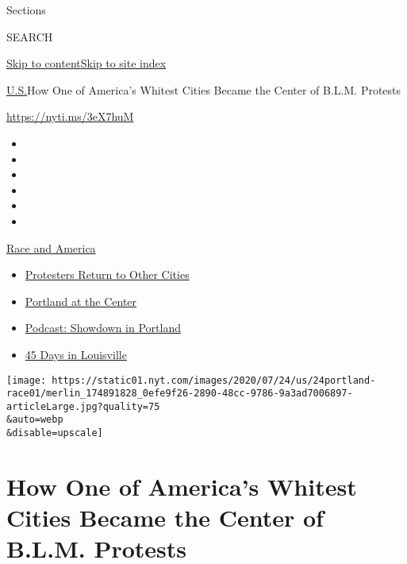 Sections

SEARCH

\protect\hyperlink{site-content}{Skip to
content}\protect\hyperlink{site-index}{Skip to site index}

\href{/section/us}{U.S.}\textbar{}How One of America's Whitest Cities
Became the Center of B.L.M. Protests

\url{https://nyti.ms/3eX7huM}

\begin{itemize}
\item
\item
\item
\item
\item
\item
\end{itemize}

\href{https://www.nytimes.com/news-event/george-floyd-protests-minneapolis-new-york-los-angeles?action=click\&pgtype=Article\&state=default\&region=TOP_BANNER\&context=storylines_menu}{Race
and America}

\begin{itemize}
\tightlist
\item
  \href{https://www.nytimes.com/2020/07/26/us/protests-portland-seattle-trump.html?action=click\&pgtype=Article\&state=default\&region=TOP_BANNER\&context=storylines_menu}{Protesters
  Return to Other Cities}
\item
  \href{https://www.nytimes.com/2020/07/24/us/portland-oregon-protests-white-race.html?action=click\&pgtype=Article\&state=default\&region=TOP_BANNER\&context=storylines_menu}{Portland
  at the Center}
\item
  \href{https://www.nytimes.com/2020/07/23/podcasts/the-daily/portland-protests.html?action=click\&pgtype=Article\&state=default\&region=TOP_BANNER\&context=storylines_menu}{Podcast:
  Showdown in Portland}
\item
  \href{https://www.nytimes.com/interactive/2020/07/16/us/black-lives-matter-protests-louisville-breonna-taylor.html?action=click\&pgtype=Article\&state=default\&region=TOP_BANNER\&context=storylines_menu}{45
  Days in Louisville}
\end{itemize}

\texttt{[image: https://static01.nyt.com/images/2020/07/24/us/24portland-race01/merlin\_174891828\_0efe9f26-2890-48cc-9786-9a3ad7006897-articleLarge.jpg?quality=75\\\&auto=webp\\\&disable=upscale]}

\hypertarget{how-one-of-americas-whitest-cities-became-the-center-of-blm-protests}{%
\section{How One of America's Whitest Cities Became the Center of B.L.M.
Protests}\label{how-one-of-americas-whitest-cities-became-the-center-of-blm-protests}}

